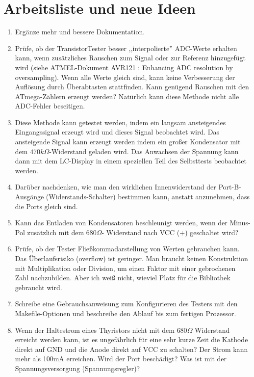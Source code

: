 
\chapter{Arbeitsliste und neue Ideen}
\label{sec:todo}

\begin{enumerate}
\item Ergänze mehr und bessere Dokumentation.
\item Prüfe, ob der TransistorTester besser ,,interpolierte''  ADC-Werte erhalten kann, wenn zusätz\-liches Rauschen zum Signal
oder zur Referenz hinzugefügt wird (siehe ATMEL-Dokument AVR121 \cite{AVR121}: Enhancing ADC resolution by oversampling).
Wenn alle Werte gleich sind, kann keine Verbesserung der Auflösung durch Überabtasten stattfinden.
Kann genügend Rauschen mit den ATmega-Zählern erzeugt werden?
Natürlich kann diese Methode nicht alle ADC-Fehler beseitigen.
\item Diese Methode kann getestet werden, indem ein langsam ansteigendes Eingangssignal erzeugt wird und dieses
Signal beobachtet wird.
Das ansteigende Signal kann erzeugt werden indem ein großer Kondensator mit dem \(470k\Omega\)-Widerstand geladen wird.
Das Anwachsen der Spannung kann dann mit dem LC-Display in einem speziellen Teil des Selbsttests beobachtet werden.
\item Darüber nachdenken, wie man den wirklichen Innenwiderstand der Port-B-Aus\-gän\-ge (Wider\-stands-Schal\-ter) bestimmen kann,
anstatt anzunehmen, dass die Ports gleich sind.
\item Kann das Entladen von Kondensatoren beschleunigt werden, wenn der Minus-Pol zusätzlich mit dem \(680\Omega\)-
Widerstand nach VCC (+) geschaltet wird?
\item Prüfe, ob der Tester Fließkommadarstellung von Werten gebrauchen kann.
Das Überlaufsrisiko (overflow) ist geringer.
Man braucht keinen Konstruktion mit Multiplikation oder Division, um einen Faktor mit einer gebrochenen Zahl nachzubilden.
Aber ich weiß nicht, wieviel Platz für die Bibliothek gebraucht wird.
\item Schreibe eine Gebrauchsanweisung zum Konfigurieren des Testers mit den Makefile-Optionen und beschreibe
den Ablauf bis zum fertigen Prozessor.
\item Wenn der Haltestrom eines Thyristors nicht mit dem \(680\Omega\) Widerstand erreicht werden kann, 
ist es ungefährlich für eine sehr kurze Zeit die Kathode direkt auf GND und die Anode direkt auf VCC zu schalten?
Der Strom kann mehr als 100mA erreichen. Wird der Port beschädigt? Was ist mit der Spannungsversorgung (Spannungsregler)?

\end{enumerate}
